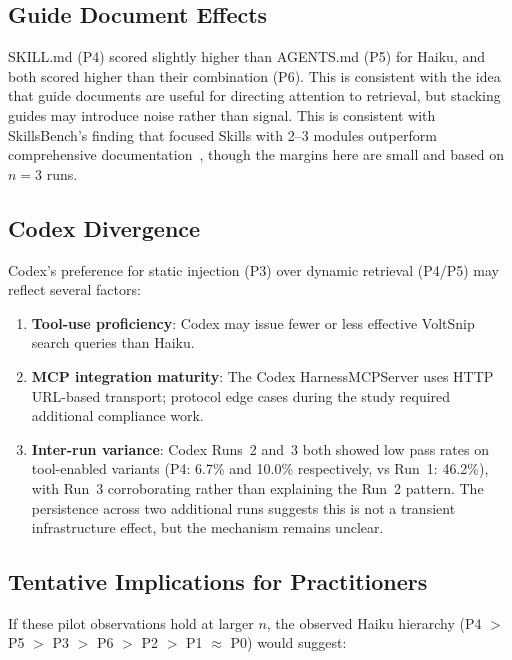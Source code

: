 \documentclass[10pt,a4paper,twocolumn]{article}
\begin{document}
\subsection{Guide Document Effects}
\label{sec:guide-effects}

SKILL.md (P4) scored slightly higher than AGENTS.md (P5) for Haiku, and both scored higher than their combination (P6).
This is consistent with the idea that guide documents are useful for directing attention to retrieval, but stacking guides may introduce noise rather than signal.
This is consistent with SkillsBench's finding that focused Skills with 2--3 modules outperform comprehensive documentation~\citep{li2026skillsbench}, though the margins here are small and based on $n{=}3$ runs.

\subsection{Codex Divergence}
\label{sec:codex-divergence}

Codex's preference for static injection (P3) over dynamic retrieval (P4/P5) may reflect several factors:

\begin{enumerate}
    \item \textbf{Tool-use proficiency}: Codex may issue fewer or less effective VoltSnip search queries than Haiku.
    \item \textbf{MCP integration maturity}: The Codex HarnessMCPServer uses HTTP URL-based transport; protocol edge cases during the study required additional compliance work.
    \item \textbf{Inter-run variance}: Codex Runs~2 and~3 both showed low pass rates on tool-enabled variants (P4: 6.7\% and 10.0\% respectively, vs Run~1: 46.2\%), with Run~3 corroborating rather than explaining the Run~2 pattern. The persistence across two additional runs suggests this is not a transient infrastructure effect, but the mechanism remains unclear.
\end{enumerate}

\subsection{Tentative Implications for Practitioners}
\label{sec:implications}

If these pilot observations hold at larger $n$, the observed Haiku hierarchy (P4 $>$ P5 $>$ P3 $>$ P6 $>$ P2 $>$ P1 $\approx$ P0) would suggest:
\end{document}
